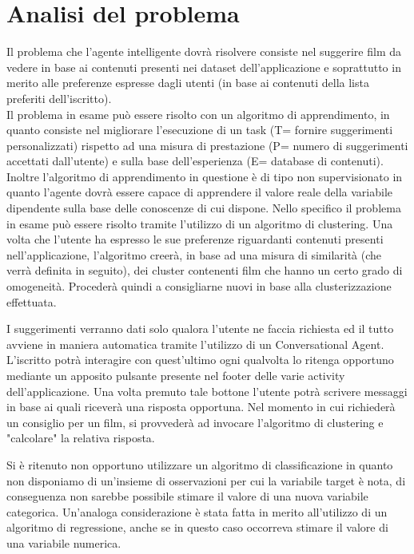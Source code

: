 \documentclass[a4paper, 10pt]{report}
\begin{document}
        \section{Analisi del problema}\label{sec:analisi-del-problema}

            Il problema che l'agente intelligente dovrà risolvere consiste nel suggerire film da vedere in base ai contenuti
            presenti nei dataset dell'applicazione e soprattutto in merito alle preferenze espresse dagli utenti (in base ai
            contenuti della lista preferiti dell'iscritto).\\
            Il problema in esame può essere risolto con un algoritmo di apprendimento, in quanto consiste nel migliorare l'esecuzione
            di un task (T= fornire suggerimenti personalizzati) rispetto ad una misura di prestazione (P= numero di suggerimenti accettati
            dall'utente) e sulla base dell'esperienza (E= database di contenuti). Inoltre l'algoritmo di apprendimento
            in questione è di tipo non supervisionato in quanto l'agente dovrà essere capace di apprendere il valore reale della
            variabile dipendente sulla base delle conoscenze di cui dispone.
            Nello specifico il problema in esame può essere risolto tramite l'utilizzo di un algoritmo di clustering. Una volta che l'utente
            ha espresso le sue preferenze riguardanti contenuti presenti nell'applicazione, l'algoritmo creerà, in base ad una misura di similarità
            (che verrà definita in seguito), dei cluster contenenti film che hanno un certo grado di omogeneità. Procederà quindi a consigliarne nuovi
            in base alla clusterizzazione effettuata.

            I suggerimenti verranno dati solo qualora l'utente ne faccia richiesta ed il tutto avviene in maniera automatica tramite l'utilizzo
            di un Conversational Agent. L'iscritto potrà interagire con quest'ultimo ogni qualvolta lo ritenga opportuno mediante un apposito
            pulsante presente nel footer delle varie activity dell'applicazione. Una volta premuto tale bottone l'utente potrà scrivere messaggi
            in base ai quali riceverà una risposta opportuna. Nel momento in cui richiederà un consiglio per un film, si provvederà ad invocare
            l'algoritmo di clustering e "calcolare" la relativa risposta.

            Si è ritenuto non opportuno utilizzare un algoritmo di classificazione in quanto non disponiamo di un'insieme di osservazioni per cui
            la variabile target è nota, di conseguenza non sarebbe possibile stimare il valore di una nuova variabile categorica.
            Un'analoga considerazione è stata fatta in merito all'utilizzo di un algoritmo di regressione, anche se in questo caso occorreva
            stimare il valore di una variabile numerica.
\end{document}
